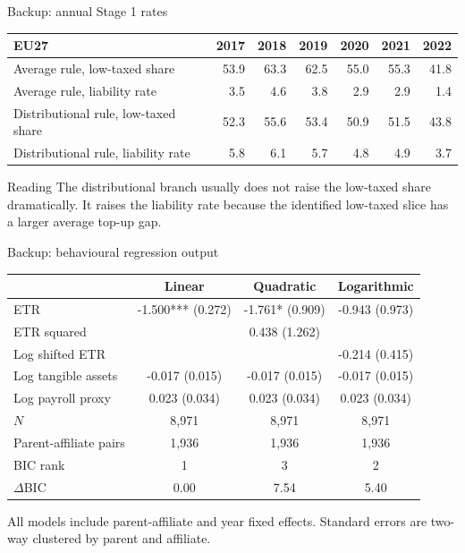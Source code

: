 \documentclass[aspectratio=169, 11pt]{beamer}
\newcommand{\sourceline}[1]{}
\begin{document}
\begin{frame}{Backup: annual Stage 1 rates}
\small
\begin{center}
\scriptsize
\begin{tabular}{@{}lrrrrrr@{}}
  \toprule
  EU27 & 2017 & 2018 & 2019 & 2020 & 2021 & 2022 \\
  \midrule
  Average rule, low-taxed share & 53.9 & 63.3 & 62.5 & 55.0 & 55.3 & 41.8 \\
  Average rule, liability rate & 3.5 & 4.6 & 3.8 & 2.9 & 2.9 & 1.4 \\
  Distributional rule, low-taxed share & 52.3 & 55.6 & 53.4 & 50.9 & 51.5 & 43.8 \\
  Distributional rule, liability rate & 5.8 & 6.1 & 5.7 & 4.8 & 4.9 & 3.7 \\
  \bottomrule
\end{tabular}
\end{center}
\begin{block}{Reading}
  The distributional branch usually does not raise the low-taxed share dramatically. It raises the liability rate because the identified low-taxed slice has a larger average top-up gap.
\end{block}
\sourceline{generated Table stage1\_rates}
\end{frame}

\begin{frame}{Backup: behavioural regression output}
\small
\begin{center}
\scriptsize
\begin{tabular}{@{}lccc@{}}
  \toprule
  & Linear & Quadratic & Logarithmic \\
  \midrule
  ETR & -1.500*** (0.272) & -1.761* (0.909) & -0.943 (0.973) \\
  ETR squared & & 0.438 (1.262) & \\
  Log shifted ETR & & & -0.214 (0.415) \\
  Log tangible assets & -0.017 (0.015) & -0.017 (0.015) & -0.017 (0.015) \\
  Log payroll proxy & 0.023 (0.034) & 0.023 (0.034) & 0.023 (0.034) \\
  \midrule
  $N$ & 8,971 & 8,971 & 8,971 \\
  Parent-affiliate pairs & 1,936 & 1,936 & 1,936 \\
  BIC rank & 1 & 3 & 2 \\
  $\Delta$BIC & 0.00 & 7.54 & 5.40 \\
  \bottomrule
\end{tabular}
\end{center}
\tiny All models include parent-affiliate and year fixed effects. Standard errors are two-way clustered by parent and affiliate.
\sourceline{generated Table stage3\_regression\_table}
\end{frame}
\end{document}
